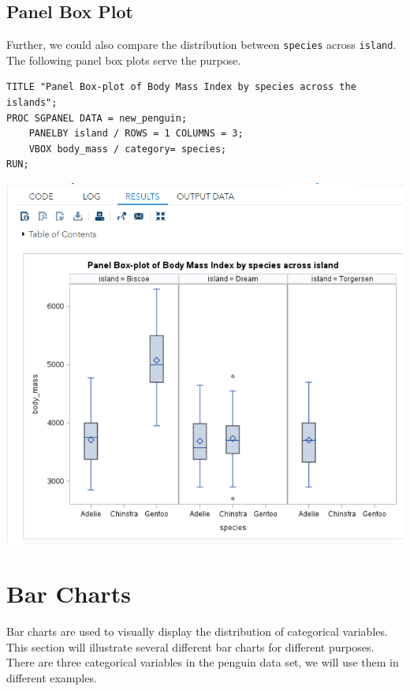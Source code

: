 \documentclass[
]{book}
\begin{document}
\hypertarget{panel-box-plot}{%
\subsection{Panel Box Plot}\label{panel-box-plot}}

Further, we could also compare the distribution between \texttt{species} across \texttt{island}. The following panel box plots serve the purpose.

\begin{verbatim}
TITLE "Panel Box-plot of Body Mass Index by species across the islands";
PROC SGPANEL DATA = new_penguin;
    PANELBY island / ROWS = 1 COLUMNS = 3;
    VBOX body_mass / category= species; 
RUN;
\end{verbatim}

\begin{center}\includegraphics[width=1\linewidth]{img06/w06-PanelBoxPlot} \end{center}

\hypertarget{bar-charts}{%
\section{Bar Charts}\label{bar-charts}}

Bar charts are used to visually display the distribution of categorical variables. This section will illustrate several different bar charts for different purposes. There are three categorical variables in the penguin data set, we will use them in different examples.
\end{document}
